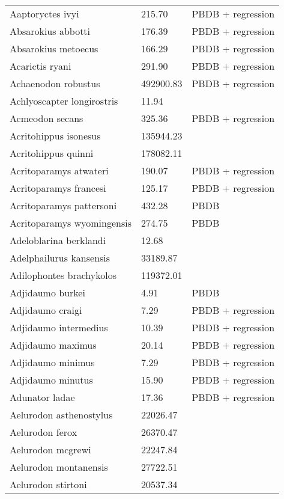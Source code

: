 \documentclass{article}
\begin{document}
\begin{center}
\begin{longtable}{p{} p{} p{} }
    \hline \hline
    \endlastfoot
Aaptoryctes ivyi & 215.70 & PBDB + regression \\ 
  Absarokius abbotti & 176.39 & PBDB + regression \\ 
  Absarokius metoecus & 166.29 & PBDB + regression \\ 
  Acarictis ryani & 291.90 & PBDB + regression \\ 
  Achaenodon robustus & 492900.83 & PBDB + regression \\ 
  Achlyoscapter longirostris & 11.94 & \cite{Tomiya2013} \\ 
  Acmeodon secans & 325.36 & PBDB + regression \\ 
  Acritohippus isonesus & 135944.23 & \cite{Tomiya2013} \\ 
  Acritohippus quinni & 178082.11 & \cite{Tomiya2013} \\ 
  Acritoparamys atwateri & 190.07 & PBDB + regression \\ 
  Acritoparamys francesi & 125.17 & PBDB + regression \\ 
  Acritoparamys pattersoni & 432.28 & PBDB \\ 
  Acritoparamys wyomingensis & 274.75 & PBDB \\ 
  Adeloblarina berklandi & 12.68 & \cite{Tomiya2013} \\ 
  Adelphailurus kansensis & 33189.87 & \cite{Tomiya2013} \\ 
  Adilophontes brachykolos & 119372.01 & \cite{Tomiya2013} \\ 
  Adjidaumo burkei & 4.91 & PBDB \\ 
  Adjidaumo craigi & 7.29 & PBDB + regression \\ 
  Adjidaumo intermedius & 10.39 & PBDB + regression \\ 
  Adjidaumo maximus & 20.14 & PBDB + regression \\ 
  Adjidaumo minimus & 7.29 & PBDB + regression \\ 
  Adjidaumo minutus & 15.90 & PBDB + regression \\ 
  Adunator ladae & 17.36 & PBDB + regression \\ 
  Aelurodon asthenostylus & 22026.47 & \cite{Tomiya2013} \\ 
  Aelurodon ferox & 26370.47 & \cite{Tomiya2013} \\ 
  Aelurodon mcgrewi & 22247.84 & \cite{Tomiya2013} \\ 
  Aelurodon montanensis & 27722.51 & \cite{Tomiya2013} \\ 
  Aelurodon stirtoni & 20537.34 & \cite{Tomiya2013} \\ 

\end{longtable}
\end{center}
\end{document}
